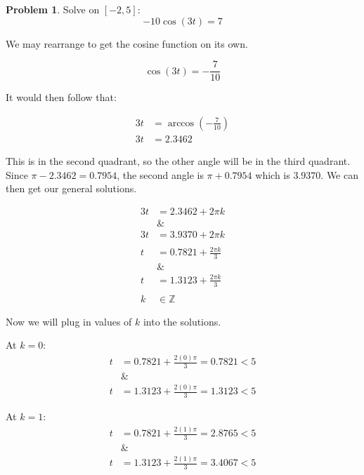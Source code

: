 \documentclass[12pt]{article}
\theoremstyle{definition}
\newtheorem{problem}{Problem}
\begin{document}
\begin{problem}
Solve on $[-2, 5]$:
\begin{equation*}
    -10\cos(3t) = 7 \label{eq:7}
\end{equation*}
\end{problem}

We may rearrange to get the cosine function on its own.

\begin{equation}
    \cos(3t) = -\frac{7}{10}
\end{equation}

It would then follow that:

\begin{align}
    3t & = \arccos\left(-\frac{7}{10}\right) \\
    3t & = 2.3462
\end{align}

This is in the second quadrant, so the other angle will be in the third quadrant.
Since $\pi - 2.3462 = 0.7954$, the second angle is $\pi + 0.7954$ which is $3.9370$.
We can then get our general solutions.

\begin{align}
    3t & = 2.3462 + 2\pi k           \\
       & \&                          \\
    3t & = 3.9370 + 2\pi k           \\
    \nonumber                        \\
    t  & = 0.7821 + \frac{2\pi k}{3} \\
       & \&                          \\
    t  & = 1.3123 + \frac{2\pi k}{3} \\
    \nonumber                        \\
    k  & \in \mathbb{Z}
\end{align}

Now we will plug in values of $k$ into the solutions.

At $k=0$:
\begin{align}
    t & = 0.7821 + \frac{2(0)\pi}{3} = 0.7821 < 5 \\
      & \&                                        \\
    t & = 1.3123 + \frac{2(0)\pi}{3} = 1.3123 < 5
\end{align}

At $k=1$:
\begin{align}
    t & = 0.7821 + \frac{2(1)\pi}{3} = 2.8765 < 5 \\
      & \&                                        \\
    t & = 1.3123 + \frac{2(1)\pi}{3} = 3.4067 < 5
\end{align}
\end{document}
